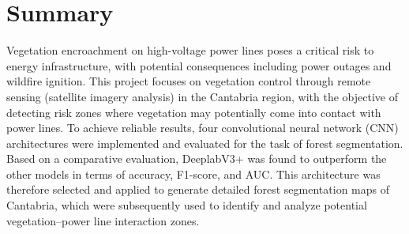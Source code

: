  
\chapter*{Summary}
Vegetation encroachment on high-voltage power lines poses a critical risk to energy infrastructure, with potential consequences including power outages and wildfire ignition. This project focuses on vegetation control through remote sensing (satellite imagery analysis) in the Cantabria region, with the objective of detecting risk zones where vegetation may potentially come into contact with power lines. To achieve reliable results, four convolutional neural network (CNN) architectures were implemented and evaluated for the task of forest segmentation. Based on a comparative evaluation, DeeplabV3+ was found to outperform the other models in terms of accuracy, F1-score, and AUC. This architecture was therefore selected and applied to generate detailed forest segmentation maps of Cantabria, which were subsequently used to identify and analyze potential vegetation–power line interaction zones.
